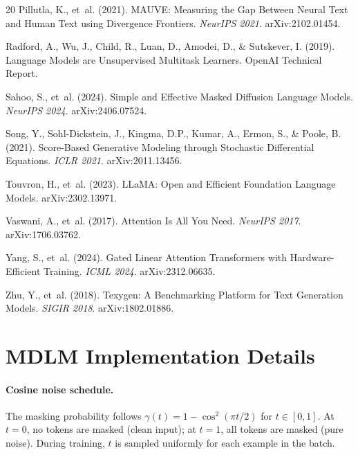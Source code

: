 \documentclass[11pt,a4paper]{article}
\begin{document}
\begin{thebibliography}{20}
Pillutla, K., et~al. (2021).
\newblock MAUVE: Measuring the Gap Between Neural Text and Human Text using Divergence Frontiers.
\newblock \textit{NeurIPS 2021}. arXiv:2102.01454.

Radford, A., Wu, J., Child, R., Luan, D., Amodei, D., \& Sutskever, I. (2019).
\newblock Language Models are Unsupervised Multitask Learners.
\newblock OpenAI Technical Report.

Sahoo, S., et~al. (2024).
\newblock Simple and Effective Masked Diffusion Language Models.
\newblock \textit{NeurIPS 2024}. arXiv:2406.07524.

Song, Y., Sohl-Dickstein, J., Kingma, D.P., Kumar, A., Ermon, S., \& Poole, B. (2021).
\newblock Score-Based Generative Modeling through Stochastic Differential Equations.
\newblock \textit{ICLR 2021}. arXiv:2011.13456.

Touvron, H., et~al. (2023).
\newblock LLaMA: Open and Efficient Foundation Language Models.
\newblock arXiv:2302.13971.

Vaswani, A., et~al. (2017).
\newblock Attention Is All You Need.
\newblock \textit{NeurIPS 2017}. arXiv:1706.03762.

Yang, S., et~al. (2024).
\newblock Gated Linear Attention Transformers with Hardware-Efficient Training.
\newblock \textit{ICML 2024}. arXiv:2312.06635.

Zhu, Y., et~al. (2018).
\newblock Texygen: A Benchmarking Platform for Text Generation Models.
\newblock \textit{SIGIR 2018}. arXiv:1802.01886.

\end{thebibliography}

\appendix

\section{MDLM Implementation Details}
\label{app:mdlm}

\paragraph{Cosine noise schedule.}
The masking probability follows $\gamma(t) = 1 - \cos^2(\pi t / 2)$ for $t \in [0, 1]$.
At $t = 0$, no tokens are masked (clean input); at $t = 1$, all tokens are masked (pure noise).
During training, $t$ is sampled uniformly for each example in the batch.
\end{document}
